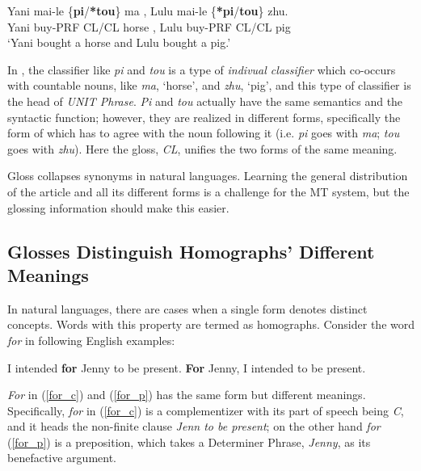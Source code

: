 \documentclass[final]{ua-thesis}
\begin{document}
\begin{exe}
\ex \label{chinese_cl_eg}
\gll Yani mai-le \{\textbf{pi}/\textbf{*tou}\} ma , Lulu mai-le \{\textbf{*pi}/\textbf{tou}\} zhu.\\ 
Yani buy-PRF CL/CL horse , Lulu buy-PRF CL/CL pig\\
\glt `Yani bought a horse and Lulu bought a pig.' \citep[p. 136]{zhang2013classifier}
\end{exe}

In \citet{zhang2013classifier}, the classifier like \textit{pi} and \textit{tou} is a type of \textit{indivual classifier} which co-occurs with countable nouns, like \textit{ma}, `horse', and \textit{zhu}, `pig', and this type of classifier is the head of \textit{UNIT Phrase}. 
\textit{Pi} and \textit{tou} actually have the same semantics and the syntactic function; however, they are realized in different forms, specifically the form of which has to agree with the noun following it (i.e. \textit{pi} goes with \textit{ma}; \textit{tou} goes with \textit{zhu}). Here the gloss, \textit{CL}, unifies the two forms of the same meaning.    

Gloss collapses synonyms in natural languages. Learning the general distribution of the article and all its different forms is a challenge for the MT system, but the glossing information should make this easier.

\subsection{Glosses Distinguish Homographs' Different Meanings}\label{sec:disa}

In natural languages, there are cases when a single form denotes distinct concepts. Words with this property are termed as homographs. Consider the word \textit{for} in following English examples:

\begin{exe}
\ex \label{for_eng}
	\begin{xlist}
	\ex \label{for_c}I intended \textbf{for} Jenny to be present.
	\ex \label{for_p}\textbf{For} Jenny, I intended to be present. \citep[p.306-307]{adger2003core}
	\end{xlist}
\end{exe}

\textit{For} in (\ref{for_c}) and (\ref{for_p}) has the same form but different meanings. Specifically, \textit{for} in (\ref{for_c}) is a complementizer with its part of speech being \textit{C}, and it heads the non-finite clause \textit{Jenn to be present}; on the other hand \textit{for} (\ref{for_p}) is a preposition, which takes a Determiner Phrase, \textit{Jenny}, as its benefactive argument.   
\end{document}
